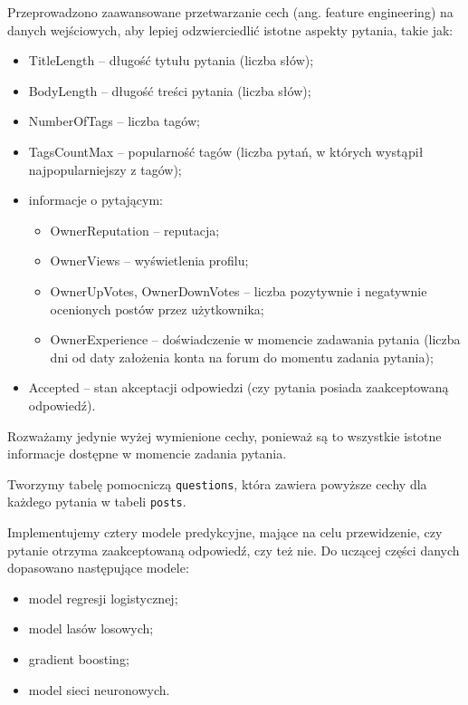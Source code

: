 \documentclass[12pt]{article}
\begin{document}
	\vspace{0.25cm}
	
	Przeprowadzono zaawansowane przetwarzanie cech (ang. feature engineering) na danych wejściowych, aby lepiej odzwierciedlić istotne aspekty pytania, takie jak:
	\begin{itemize}
		\item TitleLength -- długość tytułu pytania (liczba słów);
		\item BodyLength -- długość treści pytania (liczba słów);
		\item NumberOfTags -- liczba tagów;
		\item TagsCountMax -- popularność tagów (liczba pytań, w których wystąpił najpopularniejszy z tagów);
		\item informacje o pytającym:
		\begin{itemize}
			\item OwnerReputation -- reputacja;
			\item OwnerViews -- wyświetlenia profilu;
			\item OwnerUpVotes, OwnerDownVotes -- liczba pozytywnie i negatywnie ocenionych postów przez użytkownika;
			\item OwnerExperience -- doświadczenie w momencie zadawania pytania (liczba dni od daty założenia konta na forum do momentu zadania pytania);
		\end{itemize}
		\item Accepted -- stan akceptacji odpowiedzi (czy pytania posiada zaakceptowaną odpowiedź).
	\end{itemize}
	Rozważamy jedynie wyżej wymienione cechy, ponieważ są to wszystkie istotne informacje dostępne w momencie zadania pytania.
	
	\vspace{0.25cm}
	
	Tworzymy tabelę pomocniczą \verb|questions|, która zawiera powyższe cechy dla każdego pytania w tabeli \verb|posts|.
	
	\vspace{0.25cm}
	
	Implementujemy cztery modele predykcyjne, mające na celu przewidzenie, czy pytanie otrzyma zaakceptowaną odpowiedź, czy też nie. Do uczącej części danych dopasowano następujące modele:
	\begin{itemize}
		\item model regresji logistycznej;
		\item model lasów losowych;
		\item gradient boosting;
		\item model sieci neuronowych.
	\end{itemize}
	
\end{document}
